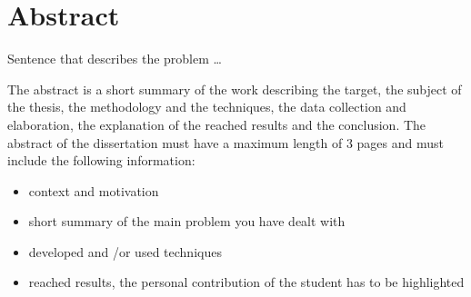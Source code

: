 \chapter*{Abstract} %
\label{abstract}

\vspace{0.4 cm} 

Sentence that describes the problem \dots

	The abstract is a short summary of the work describing the target, the subject of the thesis, the methodology 
and the techniques, the data collection and elaboration, the explanation of the reached results and the conclusion.
The abstract of the dissertation must have a maximum length of 3 pages and must include the following information: 

\begin{itemize}
  \item context and motivation
  \item short summary of the main problem you have dealt with
  \item developed and /or used techniques
  \item reached results, the personal contribution of the student has to be highlighted
\end{itemize}
